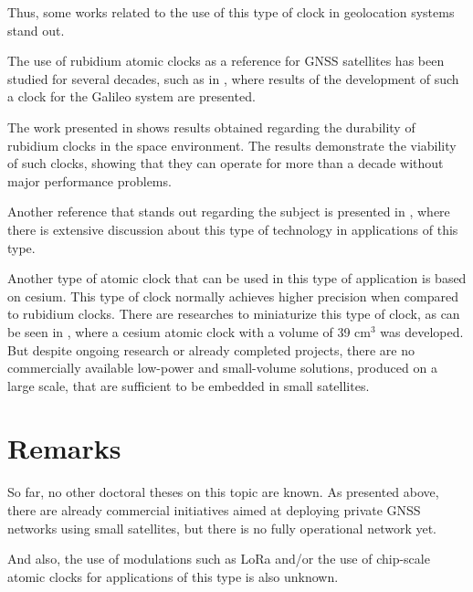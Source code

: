 Thus, some works related to the use of this type of clock in geolocation systems stand out.

The use of rubidium atomic clocks as a reference for GNSS satellites has been studied for several decades, such as in \cite{jeanmaire1999}, where results of the development of such a clock for the Galileo system are presented.

The work presented in \cite{camparo2012} shows results obtained regarding the durability of rubidium clocks in the space environment. The results demonstrate the viability of such clocks, showing that they can operate for more than a decade without major performance problems.

Another reference that stands out regarding the subject is presented in \cite{saxena2020}, where there is extensive discussion about this type of technology in applications of this type.

Another type of atomic clock that can be used in this type of application is based on cesium. This type of clock normally achieves higher precision when compared to rubidium clocks. There are researches to miniaturize this type of clock, as can be seen in \cite{tanner2013}, where a cesium atomic clock with a volume of 39 cm$^{3}$ was developed. But despite ongoing research or already completed projects, there are no commercially available low-power and small-volume solutions, produced on a large scale, that are sufficient to be embedded in small satellites.

\section{Remarks}



So far, no other doctoral theses on this topic are known. As presented above, there are already commercial initiatives aimed at deploying private GNSS networks using small satellites, but there is no fully operational network yet.

And also, the use of modulations such as LoRa and/or the use of chip-scale atomic clocks for applications of this type is also unknown.